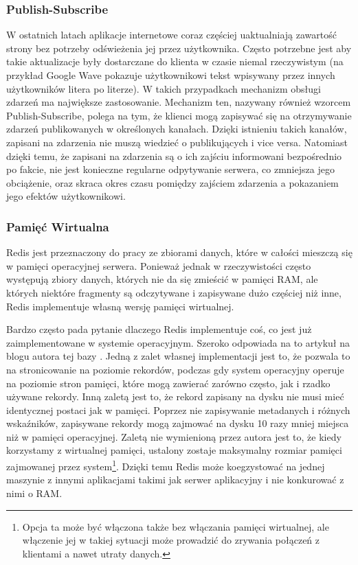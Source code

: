 \subsubsection*{Publish-Subscribe}

W ostatnich latach aplikacje internetowe coraz częściej uaktualniają zawartość strony bez potrzeby odświeżenia jej przez użytkownika.
Często potrzebne jest aby takie aktualizacje były dostarczane do klienta w czasie niemal rzeczywistym (na przykład Google Wave pokazuje użytkownikowi tekst wpisywany przez innych użytkowników litera po literze).
W takich przypadkach mechanizm obsługi zdarzeń ma największe zastosowanie.
Mechanizm ten, nazywany również wzorcem Publish-Subscribe, polega na tym, że klienci mogą zapisywać się na otrzymywanie zdarzeń publikowanych w określonych kanałach.
Dzięki istnieniu takich kanałów, zapisani na zdarzenia nie muszą wiedzieć o publikujących i vice versa.
Natomiast dzięki temu, że zapisani na zdarzenia są o ich zajściu informowani bezpośrednio po fakcie, nie jest konieczne regularne odpytywanie serwera, co zmniejsza jego obciążenie, oraz skraca okres czasu pomiędzy zajściem zdarzenia a pokazaniem jego efektów użytkownikowi.

\subsubsection*{Pamięć Wirtualna}

Redis jest przeznaczony do pracy ze zbiorami danych, które w całości mieszczą się w pamięci operacyjnej serwera.
Ponieważ jednak w rzeczywistości często występują zbiory danych, których nie da się zmieścić w pamięci RAM, ale których niektóre fragmenty są odczytywane i zapisywane dużo częściej niż inne, Redis implementuje własną wersję pamięci wirtualnej.

Bardzo często pada pytanie dlaczego Redis implementuje coś, co jest już zaimplementowane w systemie operacyjnym.
Szeroko odpowiada na to artykuł na blogu autora tej bazy \cite{antirez-redis-vm}.
Jedną z zalet własnej implementacji jest to, że pozwala to na stronicowanie na poziomie rekordów, podczas gdy system operacyjny operuje na poziomie stron pamięci, które mogą zawierać zarówno często, jak i rzadko używane rekordy.
Inną zaletą jest to, że rekord zapisany na dysku nie musi mieć identycznej postaci jak w pamięci.
Poprzez nie zapisywanie metadanych i różnych wskaźników, zapisywane rekordy mogą zajmować na dysku 10 razy mniej miejsca niż w pamięci operacyjnej.
Zaletą nie wymienioną przez autora jest to, że kiedy korzystamy z wirtualnej pamięci, ustalony zostaje maksymalny rozmiar pamięci zajmowanej przez system\footnote{Opcja ta może być włączona także bez włączania pamięci wirtualnej, ale włączenie jej w takiej sytuacji może prowadzić do zrywania połączeń z klientami a nawet utraty danych.}.
Dzięki temu Redis może koegzystować na jednej maszynie z innymi aplikacjami takimi jak serwer aplikacyjny i nie konkurować z nimi o RAM.

